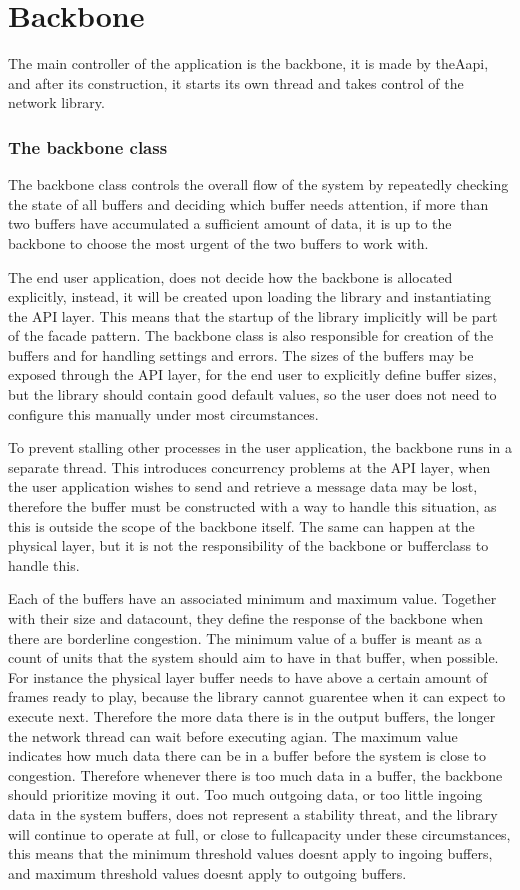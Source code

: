 \chapter{Backbone}
The main controller of the application is the backbone, it is made by theAapi, and after its construction, it starts its own thread and takes control of the network library.

\subsection{The backbone class}
The backbone class controls the overall flow of the system by repeatedly checking the state of all buffers and deciding which buffer needs attention, if more than two buffers have accumulated a sufficient amount of data, it is up to the backbone to choose the most urgent of the two buffers to work with.

The end user application, does not decide how the backbone is allocated explicitly, instead, it will be created upon loading the library and instantiating the API layer. This means that the startup of the library implicitly will be part of the facade pattern.
The backbone class is also responsible for creation of the buffers and for handling settings and errors. The sizes of the buffers may be exposed through the API layer, for the end user to explicitly define buffer sizes, but the library should contain good default values, so the user does not need to configure this manually under most circumstances.

To prevent stalling other processes in the user application, the backbone runs in a separate thread. This introduces concurrency problems at the API layer, when the user application wishes to send and retrieve a message data may be lost, therefore the buffer must be constructed with a way to handle this situation, as this is outside the scope of the backbone itself.
The same can happen at the physical layer, but it is not the responsibility of the backbone or bufferclass to handle this.

Each of the buffers have an associated minimum and maximum value. Together with their size and datacount, they define the response of the backbone when there are borderline congestion.
The minimum value of a buffer is meant as a count of units that the system should aim to have in that buffer, when possible. For instance the physical layer buffer needs to have above a certain amount of frames ready to play, because the library cannot guarentee when it can expect to execute next. Therefore the more data there is in the output buffers, the longer the network thread can wait before executing agian.
The maximum value indicates how much data there can be in a buffer before the system is close to congestion. Therefore whenever there is too much data in a buffer, the backbone should prioritize moving it out.
Too much outgoing data, or too little ingoing data in the system buffers, does not represent a stability threat, and the library will continue to operate at full, or close to fullcapacity under these circumstances, this means that the minimum threshold values doesnt apply to ingoing buffers, and maximum threshold values doesnt apply to outgoing buffers.



